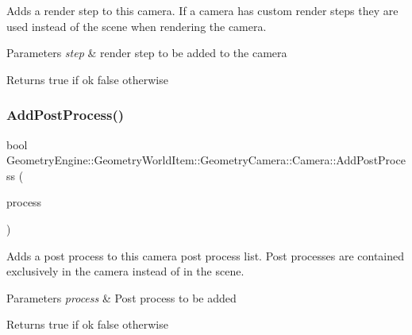 Adds a render step to this camera. If a camera has custom render steps they are used instead of the scene when rendering the camera. 
\begin{DoxyParams}{Parameters}
{\em step} & render step to be added to the camera \\
\hline
\end{DoxyParams}
\begin{DoxyReturn}{Returns}
true if ok false otherwise 
\end{DoxyReturn}
\mbox{\label{class_geometry_engine_1_1_geometry_world_item_1_1_geometry_camera_1_1_camera_aefeabe0fe7650e0b6236b59134058845}} 
\subsubsection{\texorpdfstring{AddPostProcess()}{AddPostProcess()}}
{\footnotesize\ttfamily bool Geometry\+Engine\+::\+Geometry\+World\+Item\+::\+Geometry\+Camera\+::\+Camera\+::\+Add\+Post\+Process (\begin{DoxyParamCaption}\item[{const \mbox{\hyperlink{class_geometry_engine_1_1_geometry_post_process_1_1_post_process}{Geometry\+Post\+Process\+::\+Post\+Process}} \&}]{process }\end{DoxyParamCaption})\hspace{0.3cm}{\ttfamily [virtual]}}

Adds a post process to this camera post process list. Post processes are contained exclusively in the camera instead of in the scene. 
\begin{DoxyParams}{Parameters}
{\em process} & Post process to be added \\
\hline
\end{DoxyParams}
\begin{DoxyReturn}{Returns}
true if ok false otherwise 
\end{DoxyReturn}
\mbox{\label{class_geometry_engine_1_1_geometry_world_item_1_1_geometry_camera_1_1_camera_a0a76192f4a629a8b6f7a1900078869de}} 

